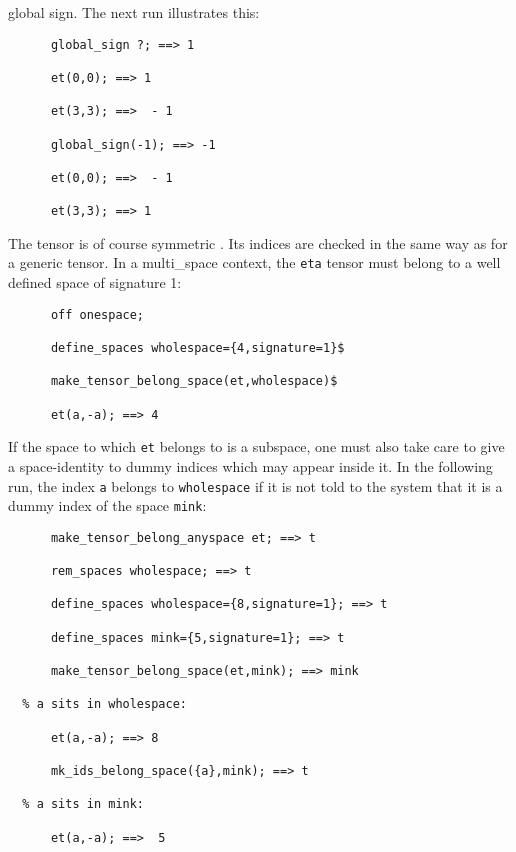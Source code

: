 global sign. The next run illustrates this:
\begin{verbatim}
      global_sign ?; ==> 1

      et(0,0); ==> 1

      et(3,3); ==>  - 1

      global_sign(-1); ==> -1

      et(0,0); ==>  - 1

      et(3,3); ==> 1
\end{verbatim}
The tensor is of course symmetric .  
Its indices are checked in the same way as for a generic tensor.
In a multi\_space context, the \texttt{eta} tensor must belong 
to a well defined space of signature 1:
\begin{verbatim}
      off onespace;

      define_spaces wholespace={4,signature=1}$  

      make_tensor_belong_space(et,wholespace)$

      et(a,-a); ==> 4
\end{verbatim}
If the space to which \texttt{et} belongs to is a subspace,
one must also
take care to give a space-identity to dummy indices which may appear inside 
it. In the following run, the index \texttt{a} belongs to \texttt{wholespace} 
if it is not told to the system that it is a dummy 
index of the space \texttt{mink}:
\begin{verbatim}
      make_tensor_belong_anyspace et; ==> t

      rem_spaces wholespace; ==> t

      define_spaces wholespace={8,signature=1}; ==> t

      define_spaces mink={5,signature=1}; ==> t

      make_tensor_belong_space(et,mink); ==> mink

  % a sits in wholespace:
   
      et(a,-a); ==> 8

      mk_ids_belong_space({a},mink); ==> t

  % a sits in mink:

      et(a,-a); ==>  5    
\end{verbatim}

